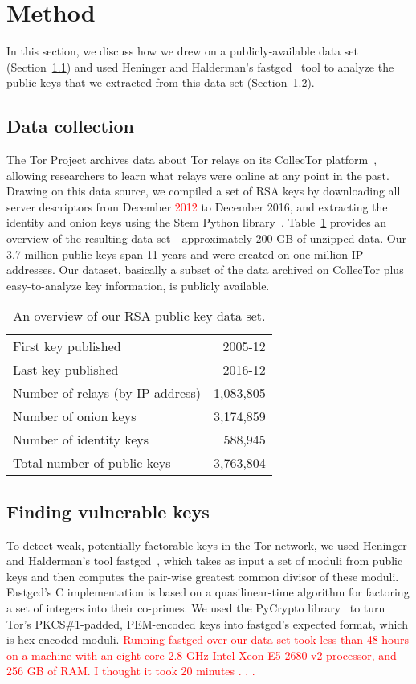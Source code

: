 \section{Method}
\label{sec:method}
In this section, we discuss how we drew on a publicly-available data set
(Section~\ref{sec:data-collection}) and used Heninger and Halderman's
fastgcd~\cite{fastgcd} tool to analyze the public keys that we extracted from
this data set (Section~\ref{sec:vulnerable-keys}).

\subsection{Data collection}
\label{sec:data-collection}
The Tor Project archives data about Tor relays on its CollecTor
platform~\cite{collector}, allowing researchers to learn what relays were online
at any point in the past.  Drawing on this data source, we compiled a set of RSA
keys by downloading all server descriptors from December \textcolor{red}{2012} to December 2016,
and extracting the identity and onion keys using the Stem Python
library~\cite{stem}.  Table~\ref{tab:dataset} provides an overview of the
resulting data set---approximately 200 GB of unzipped data.  Our 3.7 million
public keys span 11 years and were created on one million IP addresses.
Our dataset, basically a subset of the data archived on CollecTor plus
easy-to-analyze key information, is publicly available.

\begin{table}[t]
	\centering
	\begin{tabular}{l r}
	\toprule
	First key published & 2005-12 \\
	Last key published & 2016-12 \\
	Number of relays (by IP address) & 1,083,805 \\
	\midrule
	Number of onion keys & 3,174,859 \\
	Number of identity keys & 588,945 \\
	\midrule
	Total number of public keys & 3,763,804 \\
	\bottomrule
	\end{tabular}
	\caption{An overview of our RSA public key data set.}
	\label{tab:dataset}
\end{table}

\subsection{Finding vulnerable keys}
\label{sec:vulnerable-keys}
To detect weak, potentially factorable keys in the Tor network, we used Heninger
and Halderman's tool fastgcd~\cite{fastgcd}, which takes as input a set of moduli from 
public keys and then computes the pair-wise greatest common divisor of these
moduli.  Fastgcd's C implementation is based on a quasilinear-time
algorithm for factoring a set of integers into their co-primes.  We used the
PyCrypto library~\cite{pycrypto} to turn Tor's PKCS\#1-padded, PEM-encoded keys
into fastgcd's expected format, which is hex-encoded moduli.  \textcolor{red}{Running 
fastgcd over
our data set took less than 48 hours on a machine with an eight-core 2.8 GHz
Intel Xeon E5 2680 v2 processor, and 256 GB of RAM. I thought it took 20 minutes . . .}


